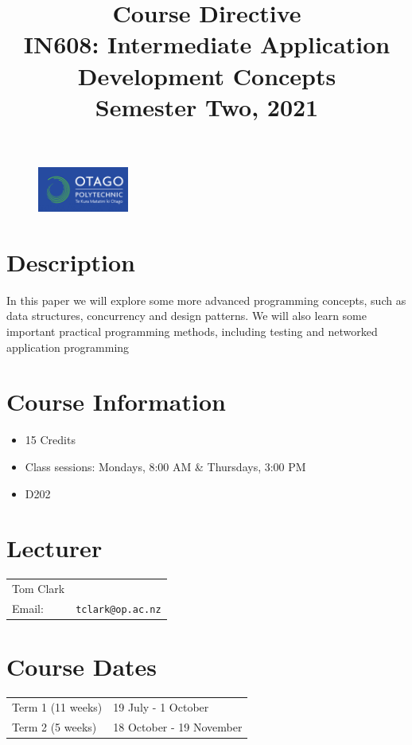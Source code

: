 \documentclass{article}
\begin{document}
\begin{figure}
\includegraphics[width=30mm]{oplogo.png}
\end{figure}

\title{Course Directive\\IN608: Intermediate Application Development Concepts \\Semester Two, 2021}
\date{}
\maketitle

\section*{Description}
In this paper we will explore some more advanced programming concepts, such as data structures, concurrency and 
design patterns.  We will also learn some important practical programming methods, including testing and networked
application programming



\section*{Course Information}
\begin{itemize}
  \item 15 Credits
  \item Class sessions: Mondays, 8:00 AM \& Thursdays, 3:00 PM
  \item D202
\end{itemize}

\section*{Lecturer}
\begin{tabular}{lr}

  Tom Clark &    \\
     Email: & \texttt{tclark@op.ac.nz} \\
        
\end{tabular}

\section*{Course Dates}
\begin{tabular}{ll}
Term 1 (11 weeks) & 19 July - 1 October\\
Term 2 (5 weeks) & 18 October - 19 November\\
\end{tabular}
\end{document}
